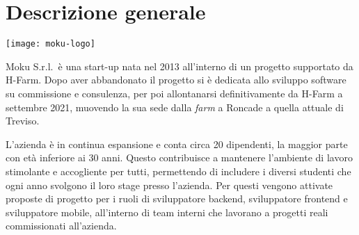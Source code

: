 \section{Descrizione generale}

\begin{center}
	\texttt{[image: moku-logo]}
\end{center}

\noindent Moku S.r.l.\ è una start-up nata nel 2013 all'interno di un progetto supportato da H-Farm. Dopo aver abbandonato il progetto si è dedicata allo sviluppo software su commissione e consulenza, per poi allontanarsi definitivamente da H-Farm a settembre 2021, muovendo la sua sede dalla \emph{farm} a Roncade a quella attuale di Treviso.

L'azienda è in continua espansione e conta circa 20 dipendenti, la maggior parte con età inferiore ai 30 anni. Questo contribuisce a mantenere l'ambiente di lavoro stimolante e accogliente per tutti, permettendo di includere i diversi studenti che ogni anno svolgono il loro stage presso l'azienda. Per questi vengono attivate proposte di progetto per i ruoli di sviluppatore backend, sviluppatore frontend e sviluppatore mobile, all'interno di team interni che lavorano a progetti reali commissionati all'azienda.

